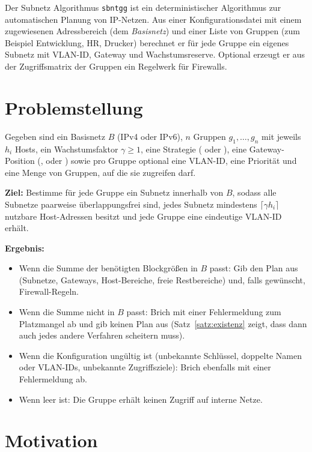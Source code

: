 \documentclass[a4paper,12pt, twoside]{report}
\theoremstyle{definition}
\newcommand{\code}[1]{\texttt{\detokenize{#1}}}
\begin{document}
Der Subnetz Algorithmus \texttt{sbntgg} ist ein deterministischer Algorithmus zur automatischen Planung von IP-Netzen. Aus einer Konfigurationsdatei mit einem zugewiesenen Adressbereich (dem \emph{Basisnetz}) und einer Liste von Gruppen (zum Beispiel \glqq Entwicklung\grqq, \glqq HR\grqq, \glqq Drucker\grqq) berechnet er für jede Gruppe ein eigenes Subnetz mit VLAN-ID, Gateway und Wachstumsreserve. Optional erzeugt er aus der Zugriffsmatrix der Gruppen ein Regelwerk für Firewalls.

\section{Problemstellung}

Gegeben sind ein Basisnetz $B$ (IPv4 oder IPv6), $n$ Gruppen $g_1,\ldots,g_n$ mit jeweils $h_i$ Hosts, ein Wachstumsfaktor $\gamma \ge 1$, eine Strategie (\code{vlsm} oder \code{fixed}), eine Gateway-Position (\code{first}, \code{last} oder \code{none}) sowie pro Gruppe optional eine VLAN-ID, eine Priorität und eine Menge von Gruppen, auf die sie zugreifen darf.

\textbf{Ziel:} Bestimme für jede Gruppe ein Subnetz innerhalb von $B$, sodass alle Subnetze paarweise überlappungsfrei sind, jedes Subnetz mindestens $\lceil \gamma h_i \rceil$ nutzbare Host-Adressen besitzt und jede Gruppe eine eindeutige VLAN-ID erhält.

\textbf{Ergebnis:}
\begin{itemize}
	\item Wenn die Summe der benötigten Blockgrößen in $B$ passt: Gib den Plan aus (Subnetze, Gateways, Host-Bereiche, freie Restbereiche) und, falls gewünscht, Firewall-Regeln.
	\item Wenn die Summe nicht in $B$ passt: Brich mit einer Fehlermeldung zum Platzmangel ab und gib keinen Plan aus (Satz~\ref{satz:existenz} zeigt, dass dann auch jedes andere Verfahren scheitern muss).
	\item Wenn die Konfiguration ungültig ist (unbekannte Schlüssel, doppelte Namen oder VLAN-IDs, unbekannte Zugriffsziele): Brich ebenfalls mit einer Fehlermeldung ab.
	\item Wenn \code{access} leer ist: Die Gruppe erhält keinen Zugriff auf interne Netze.
\end{itemize}

\section{Motivation}
\end{document}
